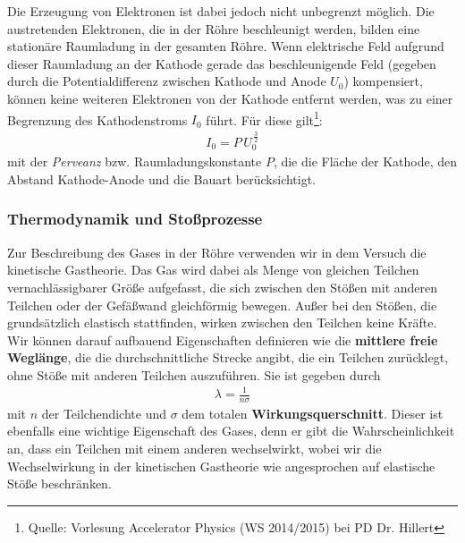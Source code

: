 \documentclass[11pt, a4paper]{article}
\begin{document}
Die Erzeugung von Elektronen ist dabei jedoch nicht unbegrenzt möglich.
Die austretenden Elektronen, die in der Röhre beschleunigt werden, bilden eine stationäre Raumladung in der gesamten Röhre.
Wenn elektrische Feld aufgrund dieser Raumladung an der Kathode gerade das beschleunigende Feld (gegeben durch die Potentialdifferenz zwischen Kathode und Anode $U_0$) kompensiert, können keine weiteren Elektronen von der Kathode entfernt werden, was zu einer Begrenzung des Kathodenstroms $I_0$ führt.
Für diese gilt\footnote{Quelle: Vorlesung Accelerator Physics (WS 2014/2015) bei PD Dr. Hillert}:
\begin{align*}
I_0=P\,U_0^{\,\frac{3}{2}}
\end{align*}
mit der \emph{Perveanz} bzw. Raumladungskonstante $P$, die die Fläche der Kathode, den Abstand Kathode-Anode und die Bauart berücksichtigt.

\subsubsection{Thermodynamik und Stoßprozesse}

Zur Beschreibung des Gases in der Röhre verwenden wir in dem Versuch die kinetische Gastheorie.
Das Gas wird dabei als Menge von gleichen Teilchen vernachlässigbarer Größe aufgefasst, die sich zwischen den Stößen mit anderen Teilchen oder der Gefäßwand gleichförmig bewegen.
Außer bei den Stößen, die grundsätzlich elastisch stattfinden, wirken zwischen den Teilchen keine Kräfte.
Wir können darauf aufbauend Eigenschaften definieren wie die \textbf{mittlere freie Weglänge}, die die durchschnittliche Strecke angibt, die ein Teilchen zurücklegt, ohne Stöße mit anderen Teilchen auszuführen.
Sie ist gegeben durch
\begin{align*}
\lambda=\frac{1}{n\sigma}
\end{align*}
mit $n$ der Teilchendichte und $\sigma$ dem totalen \textbf{Wirkungsquerschnitt}.
Dieser ist ebenfalls eine wichtige Eigenschaft des Gases, denn er gibt die Wahrscheinlichkeit an, dass ein Teilchen mit einem anderen wechselwirkt, wobei wir die Wechselwirkung in der kinetischen Gastheorie wie angesprochen auf elastische Stöße beschränken.
\end{document}
